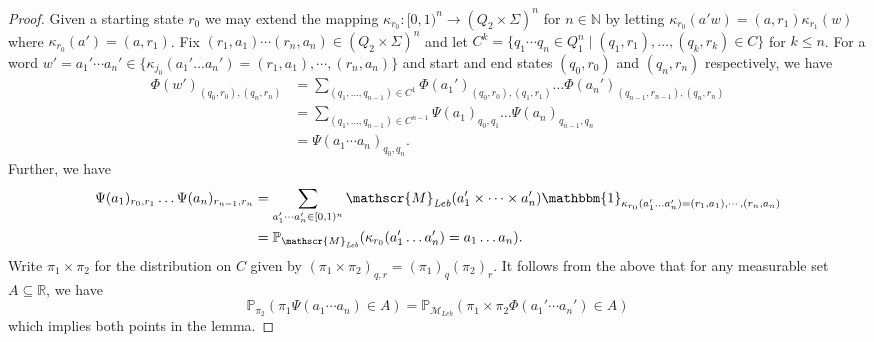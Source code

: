 \documentclass[a4paper,UKenglish,cleveref, autoref,mathscr]{lipics-v2019}
\newcommand{\RR}{\mathbb{R}}
\newcommand{\NN}{\mathbb{N}}
\newcommand{\PP}{\mathbb{P}}
\newcommand{\MM}{\mathscr{M}}
\newcommand{\1}{\mathbbm{1}}
\newcommand{\MLeb}{\MM_{\mathit{Leb}}}
\begin{document}
\begin{proof}
Given a starting state $r_0$ we may extend the mapping $\kappa_{r_0} : [0,1)^n \rightarrow (Q_2 \times \Sigma)^n$ for $n \in \NN$ by letting $\kappa_{r_0}(a'w) = (a, r_1) \kappa_{r_1}(w)$ where $\kappa_{r_0}(a') = (a, r_1)$. Fix $(r_1, a_1) \cdots (r_n, a_n) \in (Q_2 \times \Sigma)^n$ and let $C^k = \{q_1 \cdots q_n \in Q_1^n \mid (q_1, r_1), \dots, (q_k, r_k) \in C\}$ for $k \leq n$. For a word $w' = a_1' \cdots a_n' \in \{\kappa_{j_0}(a_1' \dots a_n') = (r_1, a_1), \cdots, (r_n, a_n)\}$ and start and end states $(q_0, r_0)$ and $(q_n, r_n)$ respectively, we have
\begin{align*}
\Phi(w')_{(q_0, r_0), (q_n, r_n)} & = \sum_{(q_1, \dots, q_{n-1}) \in C^1} \Phi(a_1')_{(q_0, r_0),(q_1,r_1)} \dots \Phi(a_n')_{(q_{n - 1}, r_{n - 1}),(q_n,r_n)}\\
& = \sum_{(q_1, \dots, q_{n-1}) \in C^{n-1}} \Psi(a_1)_{q_0, q_1} \dots \Psi(a_n)_{q_{n - 1}, q_n}\\
& = \Psi(a_1 \cdots a_n)_{q_0, q_n}.
\end{align*}
Further, we have
\begin{align*}
\Psi(a_1)_{r_0, r_1} \dots \Psi(a_n)_{r_{n - 1}, r_n} & = \sum_{a_1' \cdots a_n' \in [0,1)^n} \MLeb(a_1' \times \dots \times a_n')\1_{\kappa_{r_0}(a_1' \dots a_n') = (r_1, a_1), \cdots, (r_n, a_n)}\\
& = \PP_{\MLeb}(\kappa_{r_0}(a_1' \dots a_n') = a_1 \dots a_n).
\end{align*}
Write $\pi_1 \times \pi_2$ for the distribution on $C$ given by $(\pi_1 \times \pi_2)_{q,r} = (\pi_1)_q (\pi_2)_r$. It follows from the above that for any measurable set $A \subseteq \RR$, we have
\begin{equation*}
\PP_{\pi_2}(\pi_1 \Psi(a_1\cdots a_n) \in A) = \PP_{\MLeb}(\pi_1 \times \pi_2 \Phi(a_1'\cdots a_n') \in A)
\end{equation*}
which implies both points in the lemma.
\end{proof}

\constructLsystems*
\end{document}
